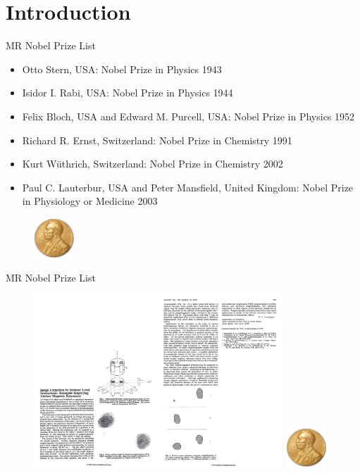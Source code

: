 \section{Introduction}%
\label{sec:introduction}

\begin{frame}[c]{MR Nobel Prize List}
      \begin{itemize}
                 \item Otto Stern, USA: Nobel Prize in Physics 1943
       		\item Isidor I. Rabi, USA: Nobel Prize in Physics 1944
     		\item Felix Bloch, USA and Edward M. Purcell, USA: Nobel Prize in Physics 1952
     		\item Richard R. Ernst, Switzerland: Nobel Prize in Chemistry 1991
     		\item Kurt Wüthrich, Switzerland: Nobel Prize in Chemistry 2002
     		\item Paul C. Lauterbur, USA and Peter Mansfield, United Kingdom: Nobel Prize in Physiology or Medicine 2003
	 \end{itemize}
  
   \begin{figure}
     \centering
          \includegraphics[height=1.5cm]{images/Nobel_Prize}
    \end{figure}
    
\end{frame}

\begin{frame}[c]{MR Nobel Prize List}
     \begin{figure}
        \centering
        \includegraphics[height=6.5cm]{images/lauterbur1973}
        \includegraphics[height=1.5cm]{images/Nobel_Prize}
    \end{figure}
\end{frame}

